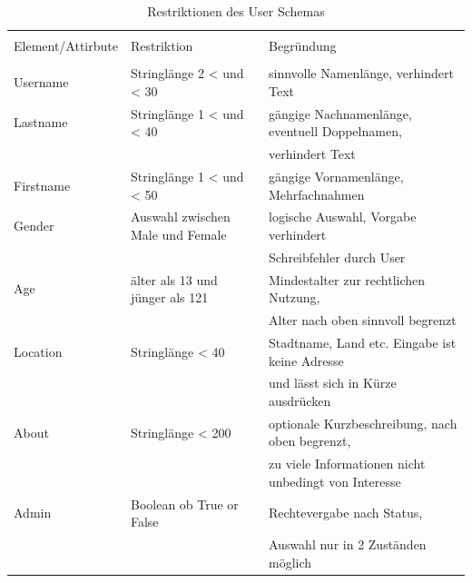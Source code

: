 \documentclass[a4paper]{article}
\begin{document}
\begin{table}[H]
\caption{Restriktionen des User Schemas}


\begin{tabular}{l l l}
\\ [-0.5ex]

\hline\hline
\\ [-0.5ex]
Element/Attirbute & Restriktion & Begründung
\\ [1.5ex]
\hline
\\ [-0.5ex]
Username & Stringlänge 2 < und < 30 & sinnvolle Namenlänge, verhindert Text \\[1ex]
Lastname & Stringlänge 1 < und < 40 & gängige Nachnamenlänge, eventuell Doppelnamen,\\[1ex]
&&verhindert Text \\[1ex]
Firstname & Stringlänge 1 < und < 50 & gängige Vornamenlänge, Mehrfachnahmen \\[1ex]
Gender & Auswahl zwischen Male und Female & logische Auswahl, Vorgabe verhindert \\[1ex]
&&Schreibfehler durch User\\[1ex]
Age & älter als 13 und jünger als 121 & Mindestalter zur rechtlichen Nutzung, \\[1ex]
&&Alter nach oben sinnvoll begrenzt \\[1ex]
Location & Stringlänge < 40 & Stadtname, Land etc. Eingabe ist keine Adresse\\[1ex]
&&und lässt sich in Kürze ausdrücken\\[1ex]
About & Stringlänge < 200 & optionale Kurzbeschreibung, nach oben begrenzt, \\[1ex]
&&zu viele Informationen nicht unbedingt von Interesse  \\[1ex]
Admin & Boolean ob True or False & Rechtevergabe nach Status,\\[1ex] 
&&Auswahl nur in 2 Zuständen möglich\\[1ex]

\hline
\end{tabular}
\label{tab:restriktionenderxsd}
\end{table}
\end{document}
